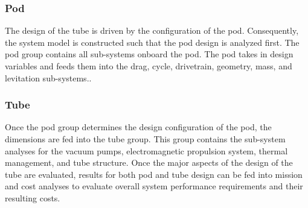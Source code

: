 \subsubsection{Pod}
	 The design of the tube is driven by the configuration of the pod. Consequently, the system model is constructed such that the pod design is analyzed first. The pod group contains all sub-systems onboard the pod. The pod takes in design variables and feeds them into the drag, cycle, drivetrain, geometry, mass, and levitation sub-systems..
\subsubsection{Tube}
	Once the pod group determines the design configuration of the pod, the dimensions are fed into the tube group. This group contains the sub-system analyses for the vacuum pumps, electromagnetic propulsion system, thermal management, and tube structure. Once the major aspects of the design of the tube are evaluated, results for both pod and tube design can be fed into mission and cost analyses to evaluate overall system performance requirements and their resulting costs.
